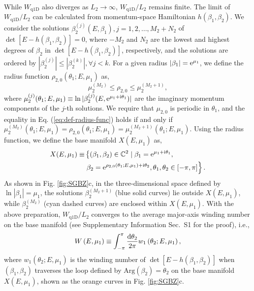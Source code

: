 \documentclass[pdflatex,sn-nature,iicol]{sn-jnl}
\theoremstyle{thmstyleone}%
\theoremstyle{thmstyletwo}%
\theoremstyle{thmstylethree}%
\begin{document}
While $W_{\text{q1D}}$ also diverges as $L_2 \rightarrow \infty$, $W_{\text{q1D}}/L_2$ remains finite. 
The limit of $W_{\text{q1D}}/L_2$ can be calculated from momentum-space Hamiltonian 
$h(\beta_1,\beta_2)$.
We consider
the solutions $\beta_{2}^{(j)}(E,\beta_{1}),j=1,2,\dots,M_{2}+N_{2}$
of $\det[E-h(\beta_{1},\beta_{2})]=0$, where $-M_{2}$ and $N_{2}$
are the lowest and highest degrees of $\beta_{2}$ in $\det[E-h(\beta_{1},\beta_{2})]$,
respectively, and the solutions are ordered by $|\beta_{2}^{(j)}|\leq|\beta_{2}^{(k)}|,\forall j<k$.
For a given radius $|\beta_{1}|=\mathrm{e}^{\mu_{1}}$,
we define the radius function  $\rho_{2,0}(\theta_{1};E,\mu_{1})$ as,
\begin{equation}
\mu_{2}^{(M_{2})}\leq\rho_{2,0}\leq\mu_{2}^{(M_{2}+1)},\label{eq:def-radius-func}
\end{equation}
where $\mu_{2}^{(j)}(\theta_{1};E,\mu_{1})\equiv\ln|\beta_{2}^{(j)}(E,\mathrm{e}^{\mu_{1}+\mathrm{i}\theta_{1}})|$
are the imaginary momentum components of the $j$-th solutions. We
require that $\mu_{2,0}$ is periodic in $\theta_{1}$, and the equality
in Eq. (\ref{eq:def-radius-func}) holds if and only if  $\mu_{2}^{(M_{2})}(\theta_{1};E,\mu_{1})=\rho_{2,0}(\theta_{1};E,\mu_{1})=\mu_{2}^{(M_{2}+1)}(\theta_{1};E,\mu_{1})$.
Using the radius function, we define the base manifold $X(E,\mu_{1})$
as, 
\begin{align}
X(E,\mu_{1})\equiv & \left\{ \left(\beta_{1},\beta_{2}\right)\in\mathbb{C}^{2}\mid\beta_{1}=\mathrm{e}^{\mu_{1}+\mathrm{i}\theta_{1}},\right.\nonumber \\
 & \left.\beta_{2}=\mathrm{e}^{\rho_{2,0}(\theta_{1};E,\mu_{1})+\mathrm{i}\theta_{2}},\theta_{1},\theta_{2}\in\left[-\pi,\pi\right]\right\} .\label{eq:base-manifold}
\end{align}
As shown in Fig. \ref{fig:SGBZ}c, in the three-dimensional space
defined by $\ln|\beta_{1}|=\mu_{1}$, the solutions $\beta_{2}^{(M_{2}+1)}$
(blue solid curves) lie outside $X(E,\mu_{1})$, while $\beta_{2}^{(M_{2})}$
(cyan dashed curves) are enclosed within $X(E,\mu_{1})$.  With the above preparation, $W_{\text{q1D}}/L_2$ converges to the average major-axis winding number on the base manifold (see Supplementary Information Sec.~S1 for the proof), i.e., 
\begin{equation}
W\left(E,\mu_{1}\right)\equiv\int_{-\pi}^{\pi}\frac{\mathrm{d}\theta_{2}}{2\pi}w_{1}\left(\theta_{2};E,\mu_{1}\right),
\end{equation}
where $w_{1}(\theta_{2};E,\mu_{1})$ is the winding number of $\det[E-h(\beta_{1},\beta_{2})]$
when $(\beta_{1},\beta_{2})$ traverses the loop defined by $\text{Arg}(\beta_{2})=\theta_{2}$
on the base manifold $X(E,\mu_{1})$, shown as the orange curves in
Fig. \ref{fig:SGBZ}c.  
$$
\text{}
$$
\end{document}
